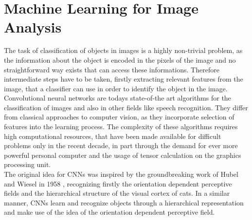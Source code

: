 
\chapter{Machine Learning for Image Analysis} %

\label{CNN} %

The task of classification of objects in images is a highly non-trivial problem, as the information about the object is encoded in the pixels of the image and no straightforward way exists that can access these informations. Therefore intermediate steps have to be taken, firstly extracting relevant features from the image, that a classifier can use in order to identify the object in the image. Convolutional neural networks are todays state-of-the art  algorithms for the classification of images and also in other fields like speech recognition. They differ from classical approaches to computer vision, as they incorporate selection of features into the learning process. The complexity of these algorithms requires high computational resources, that have been made available for difficult problems only in the recent decade, in part through the demand for ever more powerful personal computer and the usage of tensor calculation on the graphics processing unit. \\

The original idea for CNNs was inspired by the groundbreaking work of Hubel and Wiesel in 1958 \cite{Wiesel}, recognizing firstly the orientation dependent perceptive fields and the hierarchical structure of the visual cortex of cats. In a similar manner, CNNs learn and recognize objects through a hierarchical representation and make use of the idea of the orientation dependent perceptive field. 


